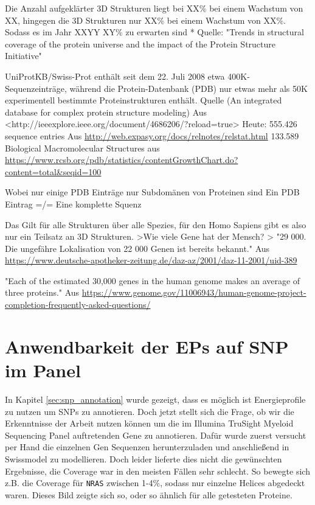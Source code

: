 Die Anzahl aufgeklärter 3D Strukturen liegt bei XX\% bei einem Wachstum von XX, hingegen die 3D Strukturen nur XX\% bei einem Wachstum von XX\%. Sodass es im Jahr XXYY XY\% zu erwarten sind * Quelle: "Trends in structural coverage of the protein universe and the impact of the Protein Structure Initiative"


UniProtKB/Swiss-Prot enthält seit dem 22. Juli 2008 etwa 400K-Sequenzeinträge, während die Protein-Datenbank (PDB) nur etwas mehr als 50K experimentell bestimmte Proteinstrukturen enthält. 
Quelle (An integrated database for complex protein structure modeling) Aus <http://ieeexplore.ieee.org/document/4686206/?reload=true> 
Heute:  
555.426 sequence entries Aus \url{http://web.expasy.org/docs/relnotes/relstat.html} 
133.589 Biological Macromolecular Structures aus \url{https://www.rcsb.org/pdb/statistics/contentGrowthChart.do?content=total&seqid=100}

Wobei nur einige PDB Einträge nur Subdomänen von Proteinen sind
Ein PDB Eintrag =/= Eine komplette Squenz

Das Gilt für alle Strukturen über alle Spezies, für den Homo Sapiens gibt es also nur ein Teilsatz an 3D Strukturen.
    >Wie viele Gene hat der Mensch? >
    "29 000. Die ungefähre Lokalisation von 22 000 Genen ist bereits bekannt."
Aus \url{https://www.deutsche-apotheker-zeitung.de/daz-az/2001/daz-11-2001/uid-389}

"Each of the estimated 30,000 genes in the human genome makes an average of three proteins."
Aus \url{https://www.genome.gov/11006943/human-genome-project-completion-frequently-asked-questions/}




\section{Anwendbarkeit der EPs auf SNP im Panel}

In Kapitel \ref{sec:snp_annotation} wurde gezeigt, dass es möglich ist Energieprofile zu nutzen um \ac{SNP}s zu annotieren. Doch jetzt stellt sich die Frage, ob wir die Erkenntnisse der Arbeit nutzen können um die im Illumina TruSight Myeloid Sequencing Panel auftretenden Gene zu annotieren. Dafür wurde zuerst versucht per Hand die einzelnen Gen Sequenzen herunterzuladen und anschließend in Swissmodel zu modellieren. Doch leider lieferte dies nicht die gewünschten Ergebnisse, die Coverage war in den meisten Fällen sehr schlecht. So bewegte sich z.B. die Coverage für \texttt{NRAS} zwischen 1-4\%, sodass nur einzelne Helices abgedeckt waren. Dieses Bild zeigte sich so, oder so ähnlich für alle getesteten Proteine. 

